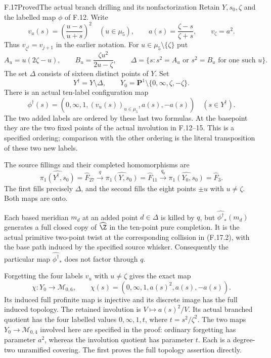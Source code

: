\begin{claim}{F.17}{Proved}{The actual branch drilling and its nonfactorization}
Retain $Y,s_0,\zeta$ and the labelled map $\phi$ of F.12.
Write
\[
 v_u(s)=\left(\frac{u-s}{u+s}\right)^2\quad(u\in\mu_5),
 \qquad a(s)=\frac{\zeta-s}{\zeta+s},
 \qquad v_\zeta=a^2.
                                                               \tag{F.17.1}
\]
Thus $v_{\zeta^j}=v_{j+1}$ in the earlier notation.
For $u\in\mu_5\setminus\{\zeta\}$ put
\[
 A_u=u(2\zeta-u),\qquad B_u=\frac{\zeta u^2}{2u-\zeta},
 \qquad
 \Delta=\{s:s^2=A_u\text{ or }s^2=B_u
                    \text{ for one such }u\}.
                                                               \tag{F.17.2}
\]
The set $\Delta$ consists of sixteen distinct points of $Y$.
Set
\[
 Y^\dagger=Y\setminus\Delta,\qquad
 Y_0=\mathbf P^1\setminus\{0,\infty,\zeta,-\zeta\}.
                                                               \tag{F.17.3}
\]
There is an actual ten-label configuration map
\[
 \phi^\dagger(s)=
       (0,\infty,1,(v_u(s))_{u\in\mu_5},a(s),-a(s))
             \quad(s\in Y^\dagger).
                                                               \tag{F.17.4}
\]
The two added labels are ordered by these last two formulas.
At the basepoint they are the two fixed points of the actual
involution in F.12--15.  This is a specified ordering; comparison
with the other ordering is the literal transposition of these
two new labels.

The source fillings and their completed homomorphisms are
\[
 \widehat{\pi_1(Y^\dagger,s_0)}=\widehat F_{27}
       \xrightarrow{\ q\ }\widehat{\pi_1(Y,s_0)}=\widehat F_{11}
       \xrightarrow{\ q_0\ }\widehat{\pi_1(Y_0,s_0)}=\widehat F_3 .
                                                               \tag{F.17.5}
\]
The first fills precisely $\Delta$, and the second fills
the eight points $\pm u$ with $u\ne\zeta$.
Both maps are onto.

Each based meridian $m_d$ at an added point $d\in\Delta$
is killed by $q$, but
$\widehat{\phi^\dagger}_*(m_d)$ generates a full closed
copy of $\widehat\Z$ in the ten-point pure completion.
It is the actual primitive two-point twist at the corresponding
collision in (F.17.2), with the base path induced by the
specified source whisker.
Consequently the particular map
$\widehat{\phi^\dagger}_*$ does not factor through $q$.

Forgetting the four labels $v_u$ with $u\ne\zeta$ gives
the exact map
\[
 \chi:Y_0\longrightarrow\mathcal M_{0,6},\qquad
                 \chi(s)=(0,\infty,1,a(s)^2,a(s),-a(s)).
                                                               \tag{F.17.6}
\]
Its induced full profinite map is injective and its discrete
image has the full induced topology.
The retained involution is $V\mapsto a(s)^2/V$.
Its actual branched quotient has the four labelled values
$0,\infty,1,t$, where $t=s^2/\zeta^2$.
The two maps $Y_0\to\mathcal M_{0,4}$ involved here are
specified in the proof: ordinary forgetting has parameter
$a^2$, whereas the involution quotient has parameter $t$.
Each is a degree-two unramified covering.
The first proves the full topology assertion directly.


\end{claim}
